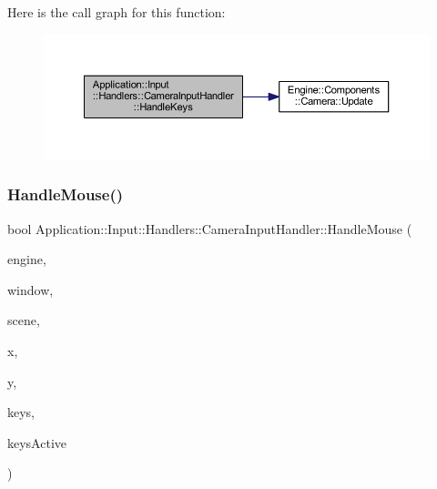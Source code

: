 Here is the call graph for this function\+:
\nopagebreak
\begin{figure}[H]
\begin{center}
\leavevmode
\includegraphics[width=350pt]{classApplication_1_1Input_1_1Handlers_1_1CameraInputHandler_a149884ea2dc9deea39d3dcd10dfa74b1_cgraph}
\end{center}
\end{figure}
\mbox{\label{classApplication_1_1Input_1_1Handlers_1_1CameraInputHandler_ab06fa94ce5265dc06abb645ea29850bd}} 
\subsubsection{\texorpdfstring{Handle\+Mouse()}{HandleMouse()}}
{\footnotesize\ttfamily bool Application\+::\+Input\+::\+Handlers\+::\+Camera\+Input\+Handler\+::\+Handle\+Mouse (\begin{DoxyParamCaption}\item[{\mbox{\hyperlink{classEngine_1_1BaseEngine}{Engine\+::\+Base\+Engine}} $\ast$}]{engine,  }\item[{\mbox{\hyperlink{classEngine_1_1Components_1_1Window}{Engine\+::\+Components\+::\+Window}} $\ast$}]{window,  }\item[{\mbox{\hyperlink{classEngine_1_1Components_1_1Scene}{Engine\+::\+Components\+::\+Scene}} $\ast$}]{scene,  }\item[{double}]{x,  }\item[{double}]{y,  }\item[{\mbox{\hyperlink{classGeneric_1_1Dictionary}{Generic\+::\+Dictionary}}$<$ short, bool $>$ \&}]{keys,  }\item[{int}]{keys\+Active }\end{DoxyParamCaption})\hspace{0.3cm}{\ttfamily [override]}}




